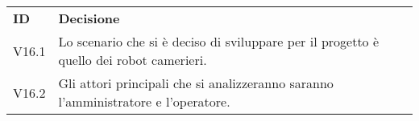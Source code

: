 \documentclass[]{article}
\begin{document}
	\begin{table} [h!]
		\begin{center}
			\begin{tabular} { m{2cm} m{14cm} }
				\rowcolor{lightgray}
				\textbf{ID} & \textbf{Decisione}\\
				V16.1 & Lo scenario che si è deciso di sviluppare per il progetto è quello dei robot camerieri.\\
				V16.2 & Gli attori principali che si analizzeranno saranno l'amministratore e l'operatore.\\
			\end{tabular}
		\end{center}
	\end{table}
	
\end{document}
